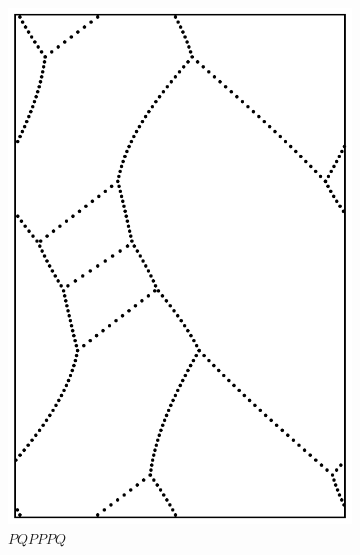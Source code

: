 \documentclass[12pt,twoside]{reedthesis}
\theoremstyle{definition}
\begin{document}
\begin{figure}[b!]
\begin{subfigure}[t]{0.24\textwidth}
    \includegraphics[width=\textwidth]{figures/string_cheese_appendix/pqpppq.pdf}
    \caption*{$PQPPPQ$}
    \vspace{5mm}
  \end{subfigure}
  \hfill
  \begin{subfigure}[t]{0.24\textwidth}

\end{subfigure}
\end{figure}
\end{document}
